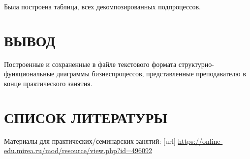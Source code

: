 Была построена таблица, всех декомпозированных подпроцессов.

\newpage

\newpage

\section*{ВЫВОД}
Построенные и сохраненные в
файле текстового формата структурно-функциональные диаграммы бизнеспроцессов,
представленные преподавателю в конце практического занятия.

\newpage
\section*{СПИСОК ЛИТЕРАТУРЫ}
\begin{thebibliography}{}
	\bibitem{}  Материалы для практических/семинарских занятий: [url]
	\url{https://online-edu.mirea.ru/mod/resource/view.php?id=496092}
\end{thebibliography}
